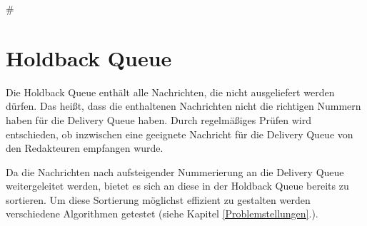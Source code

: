 #\section{Holdback Queue}

Die Holdback Queue enthält alle Nachrichten, die nicht ausgeliefert werden dürfen. Das heißt, dass die enthaltenen Nachrichten nicht die richtigen Nummern haben für die Delivery Queue haben. Durch regelmäßiges Prüfen wird entschieden, ob inzwischen eine geeignete Nachricht für die Delivery Queue von den Redakteuren empfangen wurde. 

Da die Nachrichten nach aufsteigender Nummerierung an die Delivery Queue weitergeleitet werden, bietet es sich an diese in der Holdback Queue bereits zu sortieren. 
Um diese Sortierung möglichst effizient zu gestalten werden verschiedene Algorithmen getestet (siehe Kapitel \ref{Problemstellungen}.).

